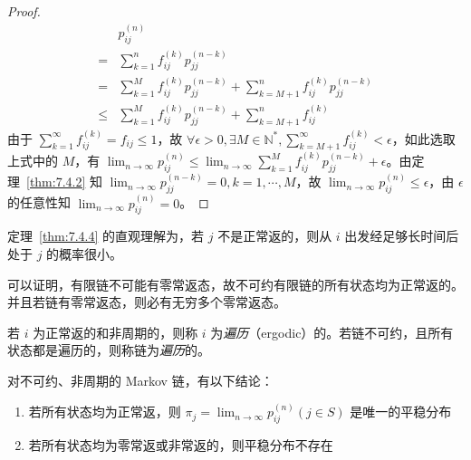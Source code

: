 \documentclass[../main.tex]{subfiles}
\begin{document}
\begin{proof}
    \begin{equation*}
        \begin{aligned}
                 & p_{ij}^{(n)}                                                                    \\
            =    & \sum_{k=1}^nf_{ij}^{(k)}p_{jj}^{(n-k)}                                          \\
            =    & \sum_{k=1}^Mf_{ij}^{(k)}p_{jj}^{(n-k)}+\sum_{k=M+1}^nf_{ij}^{(k)}p_{jj}^{(n-k)} \\
            \leq & \sum_{k=1}^Mf_{ij}^{(k)}p_{jj}^{(n-k)}+\sum_{k=M+1}^nf_{ij}^{(k)}
        \end{aligned}
    \end{equation*}
    由于 $\sum_{k=1}^\infty f_{ij}^{(k)}=f_{ij}\leq1$，故 $\forall\epsilon>0,\exists M\in\mathbb N^*,\sum_{k=M+1}^\infty f_{ij}^{(k)}<\epsilon$，如此选取上式中的 $M$，有 $\lim_{n\rightarrow\infty}p_{ij}^{(n)}\leq\lim_{n\rightarrow\infty}\sum_{k=1}^Mf_{ij}^{(k)}p_{jj}^{(n-k)}+\epsilon$。由定理~\ref{thm:7.4.2} 知 $\lim_{n\rightarrow\infty}p_{jj}^{(n-k)}=0,k=1,\cdots,M$，故 $\lim_{n\rightarrow\infty}p_{ij}^{(n)}\leq\epsilon$，由 $\epsilon$ 的任意性知 $\lim_{n\rightarrow\infty}p_{ij}^{(n)}=0$。
\end{proof}

定理~\ref{thm:7.4.4} 的直观理解为，若 $j$ 不是正常返的，则从 $i$ 出发经足够长时间后处于 $j$ 的概率很小。

可以证明，有限链不可能有零常返态，故不可约有限链的所有状态均为正常返的。并且若链有零常返态，则必有无穷多个零常返态。

\begin{definition}\label{def:7.4.3}
    若 $i$ 为正常返的和非周期的，则称 $i$ 为\emph{遍历}（ergodic）的。若链不可约，且所有状态都是遍历的，则称链为\emph{遍历}的。
\end{definition}

\begin{theorem}\label{thm:7.4.5}
    对不可约、非周期的 Markov 链，有以下结论：
    \begin{enumerate}
        \item 若所有状态均为正常返，则 $\pi_j=\lim_{n\rightarrow\infty}p_{ij}^{(n)}(j\in S)$ 是唯一的平稳分布
        \item 若所有状态均为零常返或非常返的，则平稳分布不存在
    \end{enumerate}
\end{theorem}
\end{document}
